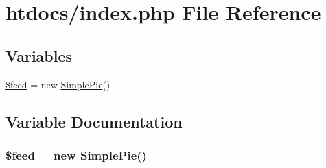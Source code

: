 \hypertarget{index_8php}{\section{htdocs/index.php File Reference}
\label{index_8php}
}
\subsection*{Variables}
\begin{DoxyCompactItemize}
\item 
\hyperlink{index_8php_a0c64e1f194986e6f51a67a8144fa305f}{\$feed} = new \hyperlink{class_simple_pie}{Simple\-Pie}()
\end{DoxyCompactItemize}


\subsection{Variable Documentation}
\hypertarget{index_8php_a0c64e1f194986e6f51a67a8144fa305f}{
\subsubsection[{\$feed}]{\setlength{\rightskip}{0pt plus 5cm}\$feed = new {\bf Simple\-Pie}()}}\label{index_8php_a0c64e1f194986e6f51a67a8144fa305f}
